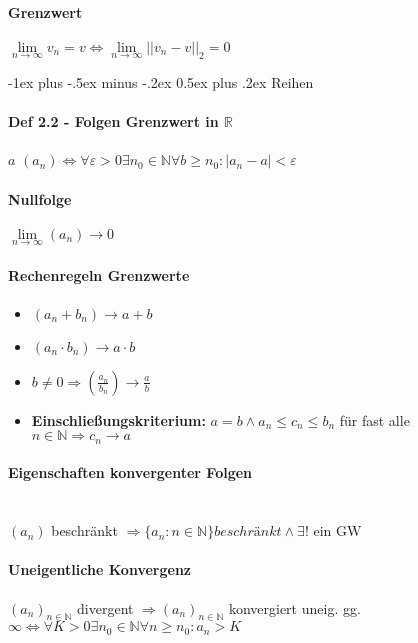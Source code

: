 \documentclass[paper=a3,paper=landscape, fontsize=9pt,DIV=25]{scrartcl}
\makeatletter
\newcommand{\real}{{\mathbb{R}}}
\newcommand{\nat}{\mathbb{N}}
\newcommand{\aseq}{(a_n)_{n \in \nat}}
\renewcommand{\section}{\@startsection{section}{1}{0mm}%
  {-1ex plus -.5ex minus -.2ex}%
  {0.5ex plus .2ex}%
  {\color{blue}\normalfont\large\bfseries}}
\makeatother
\begin{document}
\begin{multicols*}{4}
  \paragraph{Grenzwert}
  $\lim\limits_{n\rightarrow \infty} v_n = v \Leftrightarrow \lim\limits_{n\rightarrow \infty} ||v_n - v||_2 = 0$


  \section{Reihen}
  \paragraph{Def 2.2 - Folgen Grenzwert in $\real$}
  $a$  $ (a_n) \Leftrightarrow \forall \varepsilon > 0 \exists n_0 \in \nat \forall b \geq n_0 : |a_n - a| < \varepsilon$


  \paragraph{Nullfolge}
  $\lim\limits_{n \rightarrow \infty} (a_n) \rightarrow 0$


  \paragraph{Rechenregeln Grenzwerte}
  \begin{itemize}
  \item $(a_n+b_n) \rightarrow a+b$
  \item $(a_n \cdot b_n) \rightarrow a \cdot b$
  \item $b \neq 0 \Rightarrow (\frac{a_n}{b_n}) \rightarrow \frac{a}{b}$
  \item \textbf{Einschließungskriterium:} $a=b \wedge a_n \leq c_n \leq b_n$ für fast alle $n \in \nat \Rightarrow c_n \rightarrow a$
  \end{itemize}


  \paragraph{Eigenschaften konvergenter Folgen}\hspace{0pt} \\
  $(a_n)$ beschränkt $\Rightarrow \{a_n : n \in \nat\} beschränkt \wedge \exists! \text{ ein GW}$


  \paragraph{Uneigentliche Konvergenz}
  $\aseq$ divergent $\Rightarrow\aseq$ konvergiert uneig. gg. $\infty \Leftrightarrow \forall K > 0 \exists n_0 \in \nat \forall n \geq n_0: a_n > K$



\end{multicols*}
\end{document}
